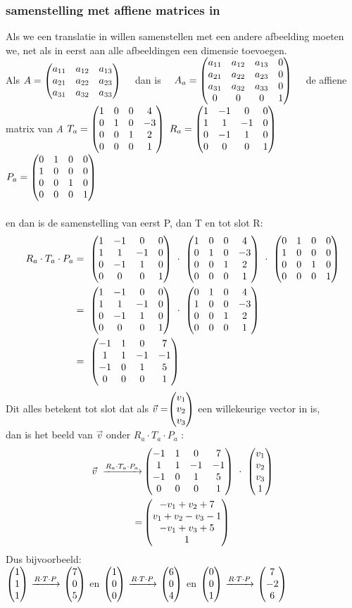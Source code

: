 \subsubsection{samenstelling met affiene matrices in \RD}
Als we een translatie in \RD willen samenstellen met een andere afbeelding moeten we, net als in \RT eerst aan alle afbeeldingen een dimensie toevoegen. \\ 
 {
	Als $ 	A = \begin{pmatrix} {}a_{11} & a_{12} & a_{13}  \\  a_{21} & a_{22}  &  a_{23} \\  a_{31} & a_{32} & a_{33} \end{pmatrix} $ \ \ 
	dan is \ \ 
	$  
	A_a = \begin{pmatrix} a_{11} & a_{12} & a_{13} & 0  \\  a_{21} & a_{22}  & a_{23} & 0  \\  a_{31} & a_{32} & a_{33} & 0 \\ 0 & 0 & 0 & 1  \end{pmatrix}  $ \ \  de affiene matrix van\textit{ A} } 
$ T_a = \begin{pmatrix}  1 & 0 & 0 & 4  \\  0 & 1 & 0 &-3  \\  0 & 0 & 1 & 2 \\ 0 & 0 & 0 & 1  \end{pmatrix} $  \qquad
$ R_a = \begin{pmatrix}  1 & -1 & 0 & 0  \\  1 & 1 & -1 & 0 \\  0 & -1 & 1  & 0 \\ 0 & 0 & 0 & 1  \end{pmatrix} $ \qquad
$ P_a = \begin{pmatrix}  0 & 1 & 0  & 0  \\  1 & 0 & 0 & 0  \\  0 & 0 & 1  & 0  \\ 0 & 0 & 0 & 1  \end{pmatrix} $ \\ \\
en dan is de samenstelling van eerst P, dan T en tot slot R:
\begin{align*} 
R_a \cdot  T_a \cdot  P_a & = \ 
\matvier{ 1 & -1 & 0 & 0 }
{ 1 & 1 & -1 & 0}
{ 0 & -1 & 1  & 0}
{0 & 0 & 0 & 1 }  \ \cdot  \ 
\matvier{ 1 & 0 & 0 & 4 }
{ 0 & 1 & 0 &-3 }
{ 0 & 0 & 1 & 2}
{0 & 0 & 0 & 1 }  \ \cdot  \ 
\matvier{ 0 & 1 & 0  & 0 }  
{ 1 & 0 & 0 & 0 }
{ 0 & 0 & 1  & 0 } 
{0 & 0 & 0 & 1 }  \\
& = \ \matvier { 1 & -1 & 0 & 0 }
{ 1 & 1 & -1 & 0}
{ 0 & -1 & 1  & 0}
{0 & 0 & 0 & 1 }  \ \cdot  \ 
\matvier{ 0 & 1 & 0 & 4 }
{ 1 & 0 & 0 &-3 }
{ 0 & 0 & 1 & 2}
{0 & 0 & 0 & 1 }   \\
& = \ \matvier{ -1 & 1 & 0 & 7 }
{ 1 & 1 & -1 & -1 }
{ -1 & 0 & 1 & 5}
{0 & 0 & 0 & 1 }  
\end{align*} 
Dit alles betekent tot slot dat als $\vec{v} = \vecdriesnel{v} $ een willekeurige vector in \RD is, \\dan is  het beeld van $ \vec{v} $ onder $  R_a \cdot  T_a \cdot  P_a $ :
\begin{align*} 
\vec{v}  \  \xrightarrow{R_a \cdot  T_a \cdot  P_a}   
&   \matvier{ -1 & 1 & 0 & 7 }
{ 1 & 1 & -1 & -1 }
{ -1 & 0 & 1 & 5}
{0 & 0 & 0 & 1 }  \ \cdot  \ 
\matvier{v_1}{v_2}{v_3}{1}  \\ 
=  & \matvier {-v_1+v_2+7} 
{ v_1+v_2-v_3 -1 }
{-v_1+v_3+ 5} {1} 
\end{align*}                        
Dus bijvoorbeeld: \\
$ \vecdrie{1}{1}{1}  \  \xrightarrow{R\cdot  T\cdot  P} \  \vecdrie{7}{0}{5}    $ \quad en  \quad 
$ \vecdrie{1}{0}{0}  \  \xrightarrow{R\cdot T\cdot P}  \ \vecdrie{6}{0}{4}  $ 
\quad en  \quad 
$ \vecdrie{0}{0}{1}  \  \xrightarrow{R\cdot T\cdot P}  \ \vecdrie{7}{-2}{6}  $ 

